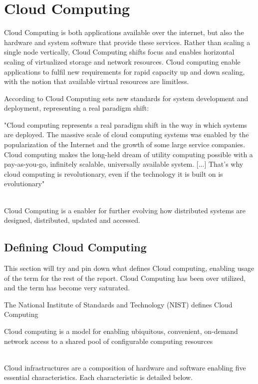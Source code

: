 \chapter{Cloud Computing}
\label{ch:cloud_computing}

Cloud Computing is both applications available over the internet, but also the hardware and system software that provide these services.
Rather than scaling a single node vertically, Cloud Computing shifts focus and enables horizontal scaling of virtualized storage and network resources\cite{armbrust2010view}. Cloud computing enable applications to fulfil new requirements for rapid capacity up and down scaling, with the notion that available virtual resources are limitless\cite{sosinsky2010cloud}.

According to \citeauthor{sosinsky2010cloud} Cloud Computing sets new standards for system development and deployment, representing a real paradigm shift:\\
\begin{quote_highlight}
"Cloud computing represents a real paradigm shift in the way in which systems are deployed. The massive scale of cloud computing systems was enabled by the popularization of the Internet and the growth of some large service companies. Cloud computing makes the long-held dream of utility computing possible with a pay-as-you-go, infinitely scalable, universally available system. [...] That’s why cloud computing is revolutionary, even if the technology it is built on is evolutionary"\cite[p. 3 ]{sosinsky2010cloud}
\end{quote_highlight}\\

Cloud Computing is a enabler for further evolving how distributed systems are designed, distributed, updated and accessed.

\section{Defining Cloud Computing}
This section will try and pin down what defines Cloud computing, enabling usage of the term for the rest of the report. Cloud Computing has been over utilized, and the term has become very saturated.

The National Institute of Standards and Technology (NIST) defines Cloud Computing\\
\begin{definition}
Cloud computing is a model for enabling ubiquitous, convenient, on-demand network access to a shared pool of configurable computing resources\citeauthor{mell2011nist}
\end{definition}
\\
Cloud infrastructures are a composition of hardware and software enabling five essential characteristics. Each characteristic is detailed below.

